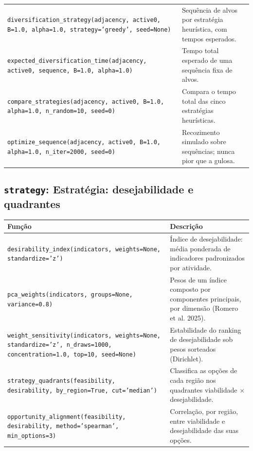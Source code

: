 \begin{longtable}{>{\raggedright\arraybackslash}p{9.2cm} >{\raggedright\arraybackslash}p{7.0cm}}
\texttt{\footnotesize diversification\_strategy(adjacency, active0, B=1.0, alpha=1.0, strategy='greedy', seed=None)} & {\small Sequ\^{e}ncia de alvos por estrat\'{e}gia heur\'{i}stica, com tempos esperados.} \\[2pt]
\texttt{\footnotesize expected\_diversification\_time(adjacency, active0, sequence, B=1.0, alpha=1.0)} & {\small Tempo total esperado de uma sequ\^{e}ncia fixa de alvos.} \\[2pt]
\texttt{\footnotesize compare\_strategies(adjacency, active0, B=1.0, alpha=1.0, n\_random=10, seed=0)} & {\small Compara o tempo total das cinco estrat\'{e}gias heur\'{i}sticas.} \\[2pt]
\texttt{\footnotesize optimize\_sequence(adjacency, active0, B=1.0, alpha=1.0, n\_iter=2000, seed=0)} & {\small Recozimento simulado sobre sequ\^{e}ncias; nunca pior que a gulosa.} \\[2pt]
\bottomrule
\end{longtable}

\subsection{\texttt{strategy}: Estrat\'{e}gia: desejabilidade e quadrantes}
\begin{longtable}{>{\raggedright\arraybackslash}p{9.2cm} >{\raggedright\arraybackslash}p{7.0cm}}
\toprule
\textbf{Fun\c{c}\~{a}o} & \textbf{Descri\c{c}\~{a}o} \\
\midrule\endhead
\texttt{\footnotesize desirability\_index(indicators, weights=None, standardize='z')} & {\small \'{I}ndice de desejabilidade: m\'{e}dia ponderada de indicadores padronizados por atividade.} \\[2pt]
\texttt{\footnotesize pca\_weights(indicators, groups=None, variance=0.8)} & {\small Pesos de um \'{i}ndice composto por componentes principais, por dimens\~{a}o (Romero et al. 2025).} \\[2pt]
\texttt{\footnotesize weight\_sensitivity(indicators, weights=None, standardize='z', n\_draws=1000, concentration=1.0, top=10, seed=None)} & {\small Estabilidade do ranking de desejabilidade sob pesos sorteados (Dirichlet).} \\[2pt]
\texttt{\footnotesize strategy\_quadrants(feasibility, desirability, by\_region=True, cut='median')} & {\small Classifica as op\c{c}\~{o}es de cada regi\~{a}o nos quadrantes viabilidade $\times$ desejabilidade.} \\[2pt]
\texttt{\footnotesize opportunity\_alignment(feasibility, desirability, method='spearman', min\_options=3)} & {\small Correla\c{c}\~{a}o, por regi\~{a}o, entre viabilidade e desejabilidade das suas op\c{c}\~{o}es.} \\[2pt]
\bottomrule
\end{longtable}

